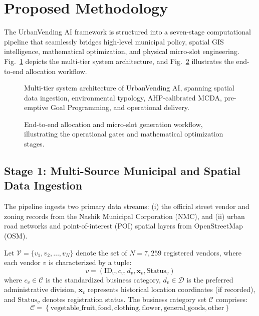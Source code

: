 \section{Proposed Methodology}
\label{sec:methodology}

The UrbanVending AI framework is structured into a seven-stage computational pipeline that seamlessly bridges high-level municipal policy, spatial GIS intelligence, mathematical optimization, and physical micro-slot engineering. Fig.~\ref{fig:architecture} depicts the multi-tier system architecture, and Fig.~\ref{fig:workflow} illustrates the end-to-end allocation workflow.

\begin{figure}[t]
    \centering
    
    \caption{Multi-tier system architecture of UrbanVending AI, spanning spatial data ingestion, environmental typology, AHP-calibrated MCDA, pre-emptive Goal Programming, and operational delivery.}
    \label{fig:architecture}
\end{figure}

\begin{figure}[t]
    \centering
    
    \caption{End-to-end allocation and micro-slot generation workflow, illustrating the operational gates and mathematical optimization stages.}
    \label{fig:workflow}
\end{figure}

\subsection{Stage 1: Multi-Source Municipal and Spatial Data Ingestion}
\label{sec:meth_stage1}

The pipeline ingests two primary data streams: (i) the official street vendor and zoning records from the Nashik Municipal Corporation (NMC), and (ii) urban road networks and point-of-interest (POI) spatial layers from OpenStreetMap (OSM).

Let $\mathcal{V} = \{v_1, v_2, \dots, v_N\}$ denote the set of $N = 7,259$ registered vendors, where each vendor $v$ is characterized by a tuple:
\begin{equation}
    v = \left( \text{ID}_v, c_v, d_v, \mathbf{x}_v, \text{Status}_v \right)
    \label{eq:vendor_tuple}
\end{equation}
where $c_v \in \mathcal{C}$ is the standardized business category, $d_v \in \mathcal{D}$ is the preferred administrative division, $\mathbf{x}_v$ represents historical location coordinates (if recorded), and $\text{Status}_v$ denotes registration status. The business category set $\mathcal{C}$ comprises:
\begin{equation}
    \mathcal{C} = \left\{ \text{vegetable\_fruit}, \text{food}, \text{clothing}, \text{flower}, \text{general\_goods}, \text{other} \right\}
    \label{eq:categories}
\end{equation}

